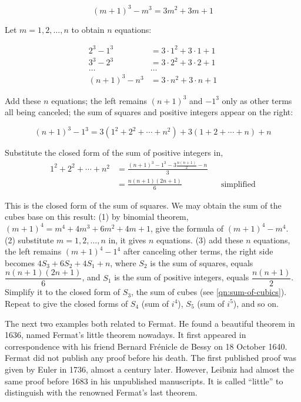 \documentclass[b5paper]{article}
\begin{document}
\[
(m + 1)^3 - m^3 = 3m^2 + 3m + 1
\]

Let $m = 1, 2, \dotsc, n$ to obtain $n$ equations:

\begin{align*}
2^3 - 1^3 &= 3\cdot1^2 + 3\cdot1 + 1 \\
3^3 - 2^3 &= 3\cdot2^2 + 3\cdot2 + 1 \\
\dotso & \dotso \\
(n+1)^3 - n^3 &= 3\cdot n^2 + 3\cdot n + 1
\end{align*}

Add these $n$ equations; the left remains $(n+1)^3$ and $-1^3$ only as other terms all being canceled; the sum of squares and positive integers appear on the right:

\[
(n+1)^3 - 1^3 = 3(1^2 + 2^2 + \dotsb + n^2) + 3(1 + 2 + \dotsb + n) + n
\]

Substitute the closed form of the sum of positive integers in,
\begin{align*}
1^2 + 2^2 + \dotsb + n^2 &= \frac{(n+1)^3 - 1^3 - 3\frac{n(n+1)}{2} - n}{3} \\
 &= \frac{n(n+1)(2n+1)}{6} && \text{simplified}
\end{align*}

This is the closed form of the sum of squares. We may obtain the sum of the cubes base on this result: (1) by binomial theorem, $(m + 1)^4 = m^4 + 4m^3 + 6m^2 + 4m + 1$, give the formula of $(m + 1)^4 - m^4$. (2) substitute $m = 1, 2, \dotsc, n$ in, it gives $n$ equations. (3) add these $n$ equations, the left remains $(m + 1)^4 - 1^4$ after canceling other terms, the right side becomes $4S_3 + 6S_2 + 4S_1 + n$, where $S_2$ is the sum of squares, equals $\dfrac{n(n+1)(2n+1)}{6}$, and $S_1$ is the sum of positive integers, equals $\dfrac{n(n+1)}{2}$. Simplify it to the closed form of $S_3$, the sum of cubes (see \cref{qn:sum-of-cubics}). Repeat to give the closed forms of $S_4$ (sum of $i^4$), $S_5$ (sum of $i^5$), and so on.

The next two examples both related to Fermat. He found a beautiful theorem in 1636, named Fermat's little theorem nowadays. It first appeared in correspondence with his friend Bernard Frénicle de Bessy on 18 October 1640. Fermat did not publish any proof before his death. The first published proof was given by Euler in 1736, almost a century later. However, Leibniz had almost the same proof before 1683 in his unpublished manuscripts. It is called \enquote{little} to distinguish with the renowned Fermat's last theorem.
\end{document}
